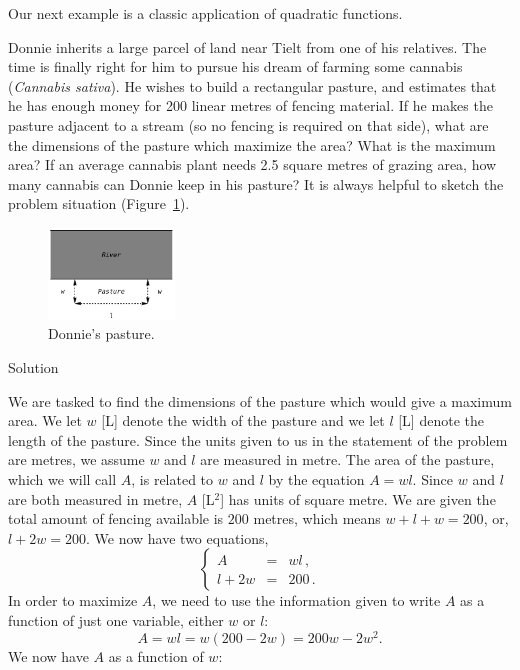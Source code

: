 \fi


\ifcourse
Our next example is a classic application of quadratic functions.

\begin{example}
 \label{donniealpaca} 
Donnie inherits a large parcel of land near Tielt from one of his relatives.  The time is finally right for him to pursue his dream of farming some cannabis (\textit{Cannabis sativa}).  He wishes to build a rectangular pasture, and estimates that he has enough money for 200 linear metres of fencing material.  If he makes the pasture adjacent to a stream (so no fencing is required on that side), what are the dimensions of the pasture which maximize the area?  What is the maximum area?  If an average cannabis plant needs 2.5 square metres of grazing area, how many cannabis can Donnie keep in his pasture?  It is always helpful to sketch the problem situation (Figure~\ref{fig_algebraic_3}).


\begin{figure}[H]
	\begin{center}
			\includegraphics[width=0.3\textwidth]{fig_algebraic_3}
	\caption{Donnie's pasture.}
	\label{fig_algebraic_3}
	\end{center}
\end{figure}

Solution 

We are tasked to find the dimensions of the pasture which would give a maximum area.  We let $w$ [L] denote the width of the pasture and we let $l$ [L] denote the length of the pasture.  Since the units given to us in the statement of the problem are metres, we assume $w$ and $l$ are measured in metre.  The area of the pasture, which we will call $A$, is related to $w$ and $l$ by the equation $A = wl$.  Since $w$ and $l$ are both measured in metre, $A$ [L$^2$] has units of square metre.  We are given the total amount of fencing available is $200$ metres, which means $w + l + w = 200$, or, $l+2w = 200$.  We now have two equations, 
$$
\left\{\begin{array}{rcl}
    A &=&wl\,,  \\
     l+2w&=&200\,.
\end{array}\right.
$$  In order to maximize $A$, we need to use the information given to write $A$ as a function of just one variable, either $w$ or $l$:
$$A = wl = w(200-2w) = 200w-2w^2.$$ 
We now have $A$ as a function of $w$:


\end{example}
